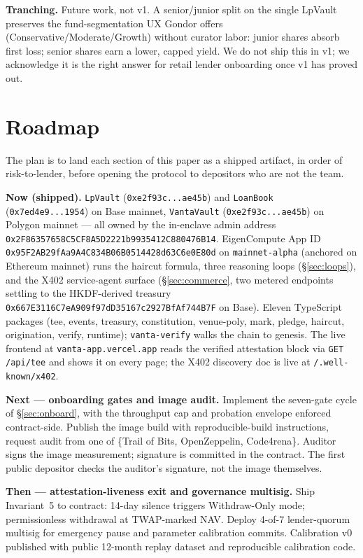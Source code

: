 \documentclass[11pt,letterpaper]{article}
\begin{document}
\textbf{Tranching.} Future work, not v1. A senior/junior split on the single LpVault preserves the fund-segmentation UX Gondor offers (Conservative/Moderate/Growth) without curator labor: junior shares absorb first loss; senior shares earn a lower, capped yield. We do not ship this in v1; we acknowledge it is the right answer for retail lender onboarding once v1 has proved out.

\section{Roadmap}
\label{sec:roadmap}

The plan is to land each section of this paper as a shipped artifact, in order of risk-to-lender, before opening the protocol to depositors who are not the team.

\textbf{Now (shipped).} \texttt{LpVault} (\texttt{0xe2f93c...ae45b}) and \texttt{LoanBook} (\texttt{0x7ed4e9...1954}) on Base mainnet, \texttt{VantaVault} (\texttt{0xe2f93c...ae45b}) on Polygon mainnet --- all owned by the in-enclave admin address \texttt{0x2F86357658C5CF8A5D2221b9935412C880476B14}. EigenCompute App ID \texttt{0x95F2AB29fAa9A4C834B06B0514428d63C6e0E80d} on \texttt{mainnet-alpha} (anchored on Ethereum mainnet) runs the haircut formula, three reasoning loops (\S\ref{sec:loops}), and the X402 service-agent surface (\S\ref{sec:commerce}, two metered endpoints settling to the HKDF-derived treasury \texttt{0x667E3116C7eA909f97dD35167c2927BfAf744B7F} on Base). Eleven TypeScript packages (tee, events, treasury, constitution, venue-poly, mark, pledge, haircut, origination, verify, runtime); \texttt{vanta-verify} walks the chain to genesis. The live frontend at \texttt{vanta-app.vercel.app} reads the verified attestation block via \texttt{GET /api/tee} and shows it on every page; the X402 discovery doc is live at \texttt{/.well-known/x402}.

\textbf{Next --- onboarding gates and image audit.} Implement the seven-gate cycle of \S\ref{sec:onboard}, with the throughput cap and probation envelope enforced contract-side. Publish the image build with reproducible-build instructions, request audit from one of \{Trail of Bits, OpenZeppelin, Code4rena\}. Auditor signs the image measurement; signature is committed in the contract. The first public depositor checks the auditor's signature, not the image themselves.

\textbf{Then --- attestation-liveness exit and governance multisig.} Ship Invariant~5 to contract: 14-day silence triggers Withdraw-Only mode; permissionless withdrawal at TWAP-marked NAV. Deploy 4-of-7 lender-quorum multisig for emergency pause and parameter calibration commits. Calibration v0 published with public 12-month replay dataset and reproducible calibration code.
\end{document}
